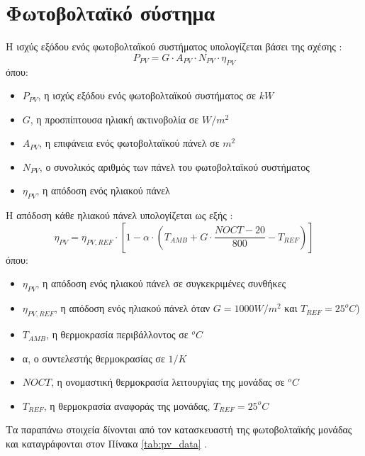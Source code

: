 \section{Φωτοβολταϊκό σύστημα}
Η ισχύς εξόδου ενός φωτοβολταϊκού συστήματος υπολογίζεται βάσει της σχέσης \cite{CAU2014820}:
\begin{equation}
    P_{PV}=G\cdot A_{PV} \cdot N_{PV} \cdot η_{PV} \label{P_PV}
\end{equation}
όπου:
\begin{itemize}
  \item[] $P_{PV}$, η ισχύς εξόδου ενός φωτοβολταϊκού συστήματος σε $kW$ 
  \\
  \item[] $G$, η προσπίπτουσα ηλιακή ακτινοβολία σε $W/m^2$ 
  \\
  \item[] $A_{PV}$, η επιφάνεια ενός φωτοβολταϊκού πάνελ σε $m^2$
  \\
  \item[] $N_{PV}$, ο συνολικός αριθμός των πάνελ του φωτοβολταϊκού συστήματος 
  \\
  \item[] $η_{PV}$, η απόδοση ενός ηλιακού πάνελ 
\end{itemize}

Η απόδοση κάθε ηλιακού πάνελ υπολογίζεται ως εξής \cite{CAU2014820}:
\begin{equation}
    \eta_{PV} = \eta_{PV,REF} \cdot \left[ 1 - \alpha \cdot \left( T_{AMB} + G \cdot \frac{NOCT - 20}{800} - T_{REF} \right) \right] \label{\eta_PV}
\end{equation}
όπου:
\begin{itemize}
  \item[] $\eta_{PV}$, η απόδοση ενός ηλιακού πάνελ σε συγκεκριμένες συνθήκες
  \\
  \item[] $\eta_{PV,REF}$, η απόδοση ενός ηλιακού πάνελ όταν $G = 1000 W/m^2$ και $T_{REF}=25^oC$)
  \\
  \item[] $T_{AMB}$, η θερμοκρασία περιβάλλοντος σε $^oC$
  \\
  \item[] α, ο συντελεστής θερμοκρασίας σε $1/K$ 
  \\
  \item[] $NOCT$, η ονομαστική θερμοκρασία λειτουργίας της μονάδας σε $^oC$ 
  \\
  \item[] $T_{REF}$, η θερμοκρασία αναφοράς της μονάδας, $Τ_{REF}=25^oC$ 
\end{itemize}
Τα παραπάνω στοιχεία δίνονται από τον κατασκευαστή της φωτοβολταϊκής μονάδας \cite{sunpower} και καταγράφονται στον Πίνακα \ref{tab:pv_data} \cite{CAU2014820}. 

